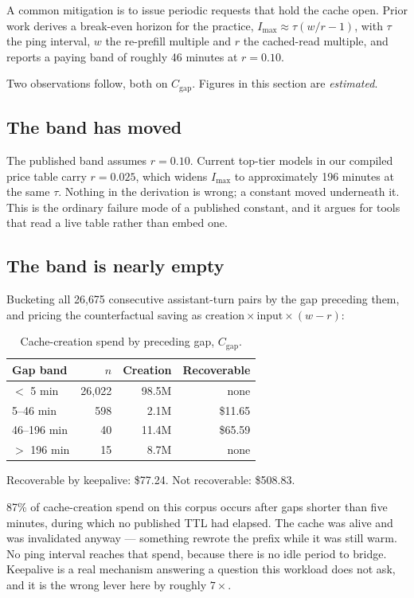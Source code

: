 \documentclass[11pt,twocolumn,letterpaper]{article}
\begin{document}
A common mitigation is to issue periodic requests that hold the cache open.
Prior work derives a break-even horizon for the practice,
$I_{\max} \approx \tau(w/r - 1)$, with $\tau$ the ping interval, $w$ the
re-prefill multiple and $r$ the cached-read multiple, and reports a paying band
of roughly 46 minutes at $r=0.10$.

Two observations follow, both on $C_{\text{gap}}$. Figures in this section are
\emph{estimated}.

\subsection{The band has moved}

The published band assumes $r = 0.10$. Current top-tier models in our compiled
price table carry $r = 0.025$, which widens $I_{\max}$ to approximately 196
minutes at the same $\tau$. Nothing in the derivation is wrong; a constant moved
underneath it. This is the ordinary failure mode of a published constant, and
it argues for tools that read a live table rather than embed one.

\subsection{The band is nearly empty}

Bucketing all 26{,}675 consecutive assistant-turn pairs by the gap preceding
them, and pricing the counterfactual saving as
$\text{creation} \times \text{input} \times (w - r)$:

\begin{table}[h]
\centering
\caption{Cache-creation spend by preceding gap, $C_{\text{gap}}$.}
\label{tab:gaps}
\vskip 0.1in
\small
\begin{tabular}{lrrr}
\toprule
\textbf{Gap band} & \textbf{$n$} & \textbf{Creation} & \textbf{Recoverable} \\
\midrule
$<$ 5 min            & 26{,}022 & 98.5M & none \\
5--46 min            & 598 & 2.1M & \$11.65 \\
46--196 min          & 40 & 11.4M & \$65.59 \\
$>$ 196 min          & 15 & 8.7M & none \\
\bottomrule
\end{tabular}
\end{table}

Recoverable by keepalive: \$77.24. Not recoverable: \$508.83.

87\% of cache-creation spend on this corpus occurs after gaps shorter than five
minutes, during which no published TTL had elapsed. The cache was alive and was
invalidated anyway --- something rewrote the prefix while it was still warm. No
ping interval reaches that spend, because there is no idle period to bridge.
Keepalive is a real mechanism answering a question this workload does not ask,
and it is the wrong lever here by roughly $7\times$.
\end{document}
